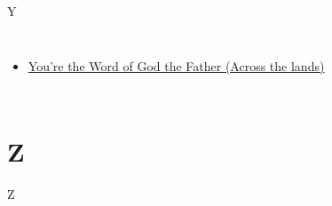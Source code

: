 \documentclass{beamer}
\begin{document}
\begin{frame}{Y}
\begin{columns}
    \begin{itemize}
    \item \hyperlink{Across the lands["You're the Word of God the Father"](Townend)1}{You're the Word of God the Father (Across the lands)}
\end{itemize}


\end{columns}

\end{frame}


\section{Z}

\begin{frame}{Z}
\begin{columns}

    


    


\end{columns}

\end{frame}
\end{document}
